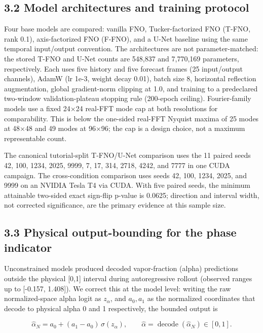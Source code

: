 \documentclass[preprint,12pt]{elsarticle}
\begin{document}
\subsection*{3.2 Model architectures and training
protocol}\label{32-model-architectures-and-training-protocol}

Four base models are compared: vanilla FNO, Tucker-factorized FNO
(T-FNO, rank 0.1), axis-factorized FNO (F-FNO)\cite{tran2023ffno}, and a U-Net baseline
using the same temporal input/output convention. The architectures are
not parameter-matched: the stored T-FNO and U-Net counts are 548,837 and
7,770,169 parameters, respectively. Each uses five history and five
forecast frames (25 input/output channels), AdamW (lr 1e-3, weight decay
0.01), batch size 8, horizontal reflection augmentation, global
gradient-norm clipping at 1.0, and training to a predeclared two-window
validation-plateau stopping rule (200-epoch ceiling). Fourier-family
models use a fixed 24\ensuremath{\times}24 real-FFT mode cap at both resolutions for
comparability. This is below the one-sided real-FFT Nyquist maxima of 25
modes at 48\ensuremath{\times}48 and 49 modes at 96\ensuremath{\times}96; the cap is a design choice, not a
maximum representable count.

The canonical tutorial-split T-FNO/U-Net comparison uses the 11 paired
seeds 42, 100, 1234, 2025, 9999, 7, 17, 314, 2718, 4242, and 7777 in one
CUDA campaign. The cross-condition comparison uses seeds 42, 100, 1234,
2025, and 9999 on an NVIDIA Tesla T4 via CUDA. With five paired seeds,
the minimum attainable two-sided exact sign-flip p-value is 0.0625;
direction and interval width, not corrected significance, are the
primary evidence at this sample size.

\subsection*{3.3 Physical output-bounding for the phase
indicator}\label{33-physical-output-bounding-for-the-phase-indicator}

Unconstrained models produced decoded vapor-fraction (alpha) predictions
outside the physical {[}0,1{]} interval during autoregressive rollout
(observed ranges up to {[}-0.157, 1.408{]}). We correct this at the
model level: writing the raw normalized-space alpha logit as
\(z_\alpha\), and \(a_0, a_1\) as the normalized coordinates that decode
to physical alpha 0 and 1 respectively, the bounded output is

\[
\widehat{\alpha}_N = a_0 + (a_1 - a_0)\,\sigma(z_\alpha), \qquad \widehat{\alpha} = \operatorname{decode}(\widehat{\alpha}_N) \in [0,1]. \tag{1}
\]
\end{document}
